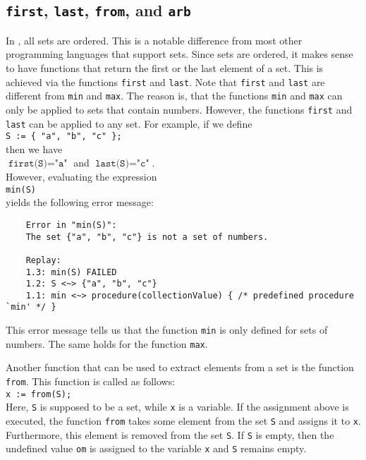 \subsection{\texttt{first}, \texttt{last}, \texttt{from}, and \texttt{arb}}
In \setlx, all sets are ordered.  This is a notable difference from most other programming languages
that support sets.  Since sets are ordered, it makes sense to have functions that return the first
or the last element of a set.  This is achieved via the functions \texttt{first} and \texttt{last}.
Note that \texttt{first} and \texttt{last} are different from \texttt{min} and \texttt{max}.  The
reason is, that the functions \texttt{min} and \texttt{max} can only be applied to sets that contain
numbers.  However, the functions \texttt{first} and \texttt{last} can be applied to any set.
For example, if we define
\\[0.2cm]
\hspace*{1.3cm}
\texttt{S := \{ "a", "b", "c" \};}
\\[0.2cm]
then we have
\\[0.2cm]
\hspace*{1.3cm}
$\texttt{first(S)} = \texttt{"a"}$ \quad and \quad $\texttt{last(S)} = \texttt{"c"}$.
\\[0.2cm]
However, evaluating the expression
\\[0.2cm]
\hspace*{1.3cm}
\texttt{min(S)}
\\[0.2cm]
yields the following error message:
\begin{verbatim}
    Error in "min(S)":
    The set {"a", "b", "c"} is not a set of numbers.
    
    Replay: 
    1.3: min(S) FAILED 
    1.2: S <~> {"a", "b", "c"}
    1.1: min <~> procedure(collectionValue) { /* predefined procedure `min' */ }
\end{verbatim}
This error message tells us that the function \texttt{min} is only defined for sets of numbers.
The same holds for the function \texttt{max}.

Another function that can be used to extract elements from a set is the function \texttt{from}.
This function is called as follows:
\\[0.2cm]
\hspace*{1.3cm} 
\texttt{x := from(S);}
\\[0.2cm]
Here, \texttt{S} is supposed to be a set, while \texttt{x} is a variable.  If the assignment above
is executed, the function \texttt{from} takes some element from the set \texttt{S} and assigns it to
\texttt{x}.   Furthermore, this element is \colorbox{amethyst}{removed} from the set \texttt{S}.
If \texttt{S} is empty, then the undefined value \texttt{om} is assigned to the variable \texttt{x}
and \texttt{S} remains empty.  

